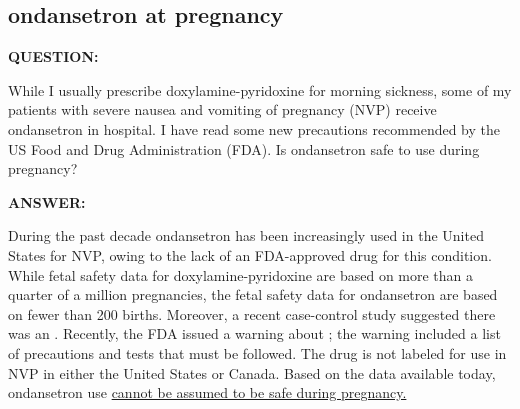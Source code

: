 \subsection{ondansetron at pregnancy}
\begin{commentbox}{}
\textbf{QUESTION:}\par
While I usually prescribe doxylamine-pyridoxine for morning sickness, some of my patients with severe nausea and vomiting of pregnancy (NVP) receive ondansetron in hospital. I have read some new precautions recommended by the US Food and Drug Administration (FDA). Is ondansetron safe to use during pregnancy?\par
\textbf{ANSWER:}\par
During the past decade ondansetron has been increasingly used in the United States for NVP, owing to the lack of an FDA-approved drug for this condition. While fetal safety data for doxylamine-pyridoxine are based on more than a quarter of a million pregnancies, the fetal safety data for ondansetron are based on fewer than 200 births. Moreover, a recent case-control study suggested there was an . Recently, the FDA issued a warning about ; the warning included a list of precautions and tests that must be followed. The drug is not labeled for use in NVP in either the United States or Canada. Based on the data available today, ondansetron use \uline{cannot be assumed to be safe during pregnancy.}
\end{commentbox}